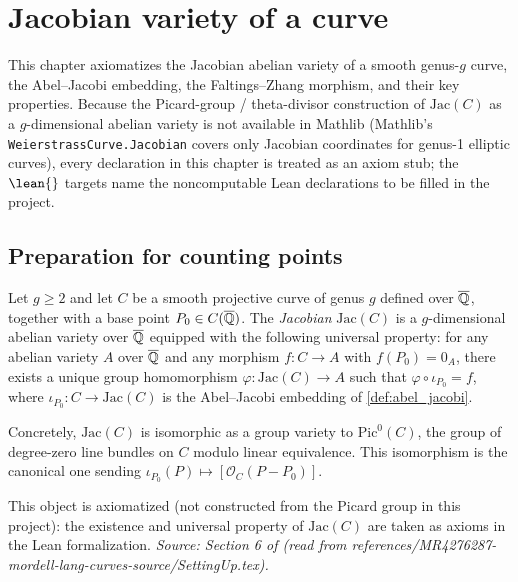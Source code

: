 \chapter{Jacobian variety of a curve}
\label{chap:jacobian}


This chapter axiomatizes the Jacobian abelian variety of a smooth genus-\(g\) curve,
the Abel--Jacobi embedding, the Faltings--Zhang morphism, and their key properties.
Because the Picard-group / theta-divisor construction of \(\mathrm{Jac}(C)\) as a
\(g\)-dimensional abelian variety is not available in Mathlib (Mathlib's
\texttt{WeierstrassCurve.Jacobian} covers only Jacobian coordinates for genus-1
elliptic curves), every declaration in this chapter is treated as an axiom stub;
the \(\lean{}\) targets name the noncomputable Lean declarations to be filled in
the project.

\section{Preparation for counting points}

\begin{definition}
  \label{def:jacobian_av}
  Let \(g \ge 2\) and let \(C\) be a smooth projective curve of genus \(g\) defined
  over \(\overline{\mathbb{Q}}\), together with a base point \(P_0 \in C(\overline{\mathbb{Q}})\).
  The \emph{Jacobian} \(\mathrm{Jac}(C)\) is a \(g\)-dimensional abelian variety
  over \(\overline{\mathbb{Q}}\) equipped with the following universal property: for any abelian
  variety \(A\) over \(\overline{\mathbb{Q}}\) and any morphism \(f \colon C \to A\) with
  \(f(P_0) = 0_A\), there exists a unique group homomorphism
  \(\varphi \colon \mathrm{Jac}(C) \to A\) such that \(\varphi \circ \iota_{P_0} = f\),
  where \(\iota_{P_0} \colon C \to \mathrm{Jac}(C)\) is the Abel--Jacobi embedding
  of \cref{def:abel_jacobi}.

  Concretely, \(\mathrm{Jac}(C)\) is isomorphic as a group variety to
  \(\mathrm{Pic}^0(C)\), the group of degree-zero line bundles on \(C\) modulo
  linear equivalence. This isomorphism is the canonical one sending
  \(\iota_{P_0}(P) \mapsto [\mathcal{O}_C(P - P_0)]\).

  This object is axiomatized (not constructed from the Picard group in this project):
  the existence and universal property of \(\mathrm{Jac}(C)\) are taken as axioms
  in the Lean formalization.
  \textit{Source: Section 6 of \cite{MR4276287-mordell-lang-curves} (read from
  references/MR4276287-mordell-lang-curves-source/SettingUp.tex).}
\end{definition}

